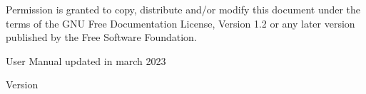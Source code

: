{\begin{titlepage}
\begin{flushleft}
    Permission is granted to copy, distribute and/or modify this document under the terms of the GNU Free Documentation License, Version 1.2 or any later version published by the Free Software Foundation.

    User Manual updated in march 2023
    \end{flushleft}
    \end{titlepage}
    \pagestyle{headings}
}{%
    \begin{titlepage}
        \large{Version \DocVersion}
    \end{titlepage}
    \clearemptydoublepage \pagestyle{headings}
    \clearemptydoublepage {}
}
\makeatother

